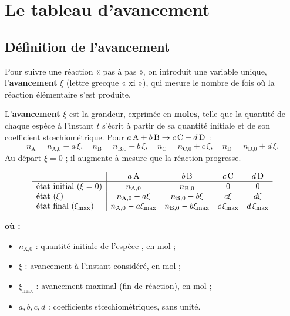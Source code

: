 \documentclass[11pt,a4paper]{article}
\newenvironment{ou}{%
  \par\smallskip\noindent\textbf{où :}\nopagebreak
  \begin{itemize}[leftmargin=1.8em,topsep=2pt,itemsep=1.5pt,parsep=0pt]}%
  {\end{itemize}}
\newcommand{\nq}[1]{n_{\text{#1}}}        %
\begin{document}
\section{Le tableau d'avancement}
\label{sec:avancement}
\subsection{Définition de l'avancement}

Pour suivre une réaction « pas à pas », on introduit une variable unique, l'\textbf{avancement}
$\xi$ (lettre grecque « xi »), qui mesure le nombre de fois où la réaction élémentaire s'est
produite.

\begin{definition}
L'\textbf{avancement} $\xi$ est la grandeur, exprimée en \textbf{moles}, telle que la quantité de
chaque espèce à l'instant $t$ s'écrit à partir de sa quantité initiale et de son coefficient
stœchiométrique. Pour $a\,\ce{A}+b\,\ce{B} \rightarrow c\,\ce{C}+d\,\ce{D}$ :
\[
\nq{A}=\nq{A,0}-a\,\xi,\quad \nq{B}=\nq{B,0}-b\,\xi,\quad \nq{C}=\nq{C,0}+c\,\xi,\quad \nq{D}=\nq{D,0}+d\,\xi.
\]
Au départ $\xi=0$ ; il augmente à mesure que la réaction progresse.
\end{definition}

\begin{formule}
\renewcommand{\arraystretch}{1.35}
\[
\begin{array}{l|cccc}
 & a\,\ce{A} & b\,\ce{B} & c\,\ce{C} & d\,\ce{D}\\
\hline
\text{état initial } (\xi=0) & \nq{A,0} & \nq{B,0} & 0 & 0\\
\text{état } (\xi) & \nq{A,0}-a\xi & \nq{B,0}-b\xi & c\xi & d\xi\\
\text{état final } (\xi_{\max}) & \nq{A,0}-a\xi_{\max} & \nq{B,0}-b\xi_{\max} & c\,\xi_{\max} & d\,\xi_{\max}\\
\end{array}
\]
\begin{ou}
  \item $\nq{X,0}$ : quantité initiale de l'espèce , en \si{\mole} ;
  \item $\xi$ : avancement à l'instant considéré, en \si{\mole} ;
  \item $\xi_{\max}$ : avancement maximal (fin de réaction), en \si{\mole} ;
  \item $a,b,c,d$ : coefficients stœchiométriques, sans unité.
\end{ou}
\end{formule}
\end{document}
